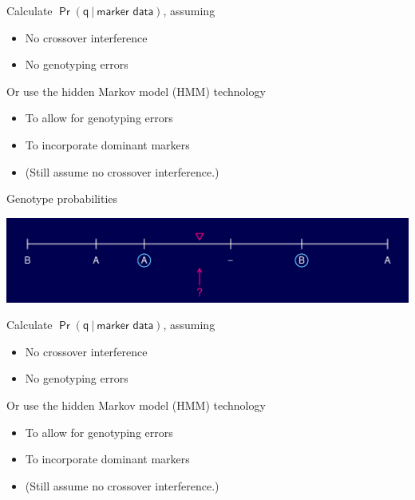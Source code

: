 \documentclass[12pt]{article}
\newcommand{\headsize}{\fontsize{35}{35} \selectfont}
\newcommand{\smallersize}{\fontsize{20}{25} \selectfont}
\begin{document}
\vspace{15mm}

\hfill
\begin{minipage}{10in}
\color{mywhite} \smallersize
Calculate {\color{myblue} $\mathsf{\Pr(q \ | \ \text{marker data})}$}, assuming
\begin{itemize}
\item No crossover interference
\item No genotyping errors
\end{itemize}

\vspace{10mm}

Or use the {\color{mypink} hidden Markov model (HMM)} technology
\begin{itemize}
\item To allow for genotyping errors
\item To incorporate dominant markers
\item {\color{myblue} (Still assume no crossover interference.)}
\end{itemize}
\end{minipage}


\newpage

\addtocounter{page}{-1}

\headsize \color{myyellow}
\hfill \begin{minipage}{5.75in}
\centering
Genotype probabilities
\end{minipage}

\vspace{15mm}

\centerline{\includegraphics{FigsA/genoprob4.pdf}}

\vspace{15mm}

\hfill
\begin{minipage}{10in}
\color{mywhite} \smallersize
Calculate {\color{myblue} $\mathsf{\Pr(q \ | \ \text{marker data})}$}, assuming
\begin{itemize}
\item No crossover interference
\item No genotyping errors
\end{itemize}

\vspace{10mm}

Or use the {\color{mypink} hidden Markov model (HMM)} technology
\begin{itemize}
\item To allow for genotyping errors
\item To incorporate dominant markers
\item {\color{myblue} (Still assume no crossover interference.)}
\end{itemize}
\end{minipage}
\end{document}
